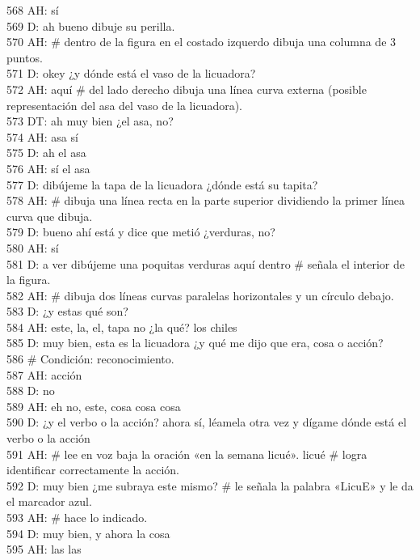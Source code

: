 568 AH: sí\\
569 D: ah bueno dibuje su perilla.\\
570 AH: \# dentro de la figura en el costado izquerdo dibuja una columna de 3 puntos.\\
571 D: okey ¿y dónde está el vaso de la licuadora?\\
572 AH: aquí \# del lado derecho dibuja una línea curva externa (posible representación del asa del vaso de la licuadora).\\
573 DT: ah muy bien ¿el asa, no?\\
574 AH: asa sí\\
575 D: ah el asa\\
576 AH: sí el asa\\
577 D: dibújeme la tapa de la licuadora ¿dónde está su tapita?\\
578 AH: \# dibuja una línea recta en la parte superior dividiendo la primer línea curva que dibuja.\\
579 D: bueno ahí está y dice que metió ¿verduras, no?\\
580 AH: sí\\
581 D: a ver dibújeme una poquitas verduras aquí dentro \# señala el interior de la figura.\\
582 AH: \# dibuja dos líneas curvas paralelas horizontales y un círculo debajo.\\
583 D: ¿y estas qué son?\\
584 AH: este, la, el, tapa no ¿la qué? los chiles\\
585 D: muy bien, esta es la licuadora ¿y qué me dijo que era, cosa o acción?\\
586 \# Condición: reconocimiento.\\
587 AH: acción\\
588 D: no\\
589 AH: eh no, este, cosa cosa cosa\\
590 D: ¿y el verbo o la acción? ahora sí, léamela otra vez y dígame dónde está el verbo o la acción\\
591 AH: \# lee en voz baja la oración «en la semana licué». licué \# logra identificar correctamente la acción.\\
592 D: muy bien ¿me subraya este mismo? \# le señala la palabra «LicuE» y le da el marcador azul.\\
593 AH: \# hace lo indicado.\\
594 D: muy bien, y ahora la cosa\\
595 AH: las las\\
